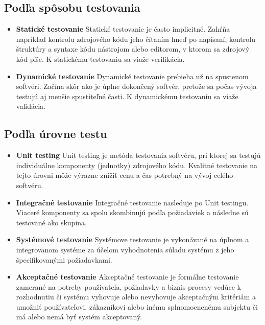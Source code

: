 \documentclass[10pt,twoside,slovak,a4paper]{article}
\begin{document}
	\subsection{Podľa spôsobu testovania}
	\begin{itemize}
		\item \textbf{Statické testovanie} \newline
			Statické testovanie je často implicitné. Zahŕňa napríklad kontrolu zdrojového kódu jeho čítaním hneď po napísaní, kontrolu štruktúry a syntaxe kódu nástrojom alebo editorom, v ktorom sa zdrojový kód píše. K statickému testovaniu sa viaže verifikácia.
		\item \textbf{Dynamické testovanie} \newline
			Dynamické testovanie prebieha už na spustenom softvéri. Začína skôr ako je úplne dokončený softvér, pretože sa počas vývoja testujú aj menšie spustiteľné časti. K dynamickému testovaniu sa viaže validácia.
	\end{itemize}
	
	\subsection{Podľa úrovne testu}
	\begin{itemize}
		\item \textbf{Unit testing} \newline
			Unit testing je metóda testovania softvéru, pri ktorej sa testujú individuálne komponenty (jednotky) zdrojového kódu. Kvalitné testovanie na tejto úrovni môže výrazne znížiť cenu a čas potrebný na vývoj celého softvéru.\cite{EST2002}
		\item \textbf{Integračné testovanie} \newline
			Integračné testovanie nasleduje po Unit testingu. Viaceré komponenty sa spolu skombinujú podľa požiadaviek a následne sú testované ako skupina.	
		\item \textbf{Systémové testovanie} \newline		
			Systémove testovanie je vykonávané na úplnom a integrovanom systéme za účelom vyhodnotenia súladu systému z jeho špecifikovanými požiadavkami.\cite{Dictionary}
		\item \textbf{Akceptačné testovanie} \newline		
			Akceptačné testovanie je formálne testovanie zamerané na potreby používateľa, požiadavky a  biznis procesy vedúce k rozhodnutiu či systému vyhovuje alebo nevyhovuje akceptačným kritériám a umožniť používateľovi, zákazníkovi alebo inému splnomocnenému subjektu či má alebo nemá byť systém akceptovaný.\cite{Veenendaal2010}
	\end{itemize}
	
	
	
	
\end{document}
